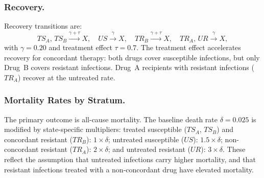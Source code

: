 \documentclass[12pt]{article}
\begin{document}
\subsubsection*{Recovery.}
Recovery transitions are:
\[
  TS_A,\, TS_B \xrightarrow{\gamma + \tau} X, \quad
  US \xrightarrow{\gamma} X, \quad
  TR_B \xrightarrow{\gamma + \tau} X, \quad
  TR_A,\, UR \xrightarrow{\gamma} X,
\]
with $\gamma = 0.20$ and treatment effect $\tau = 0.7$. The treatment effect accelerates recovery for concordant therapy: both drugs cover susceptible infections, but only Drug~B covers resistant infections. Drug~A recipients with resistant infections ($TR_A$) recover at the untreated rate.

\subsubsection*{Mortality Rates by Stratum.}
The primary outcome is all-cause mortality. The baseline death rate $\delta = 0.025$ is modified by state-specific multipliers: treated susceptible ($TS_A$, $TS_B$) and concordant resistant ($TR_B$): $1\times\delta$; untreated susceptible ($US$): $1.5\times\delta$; non-concordant resistant ($TR_A$): $2\times\delta$; and untreated resistant ($UR$): $3\times\delta$. These reflect the assumption that untreated infections carry higher mortality, and that resistant infections treated with a non-concordant drug have elevated mortality.
\end{document}
